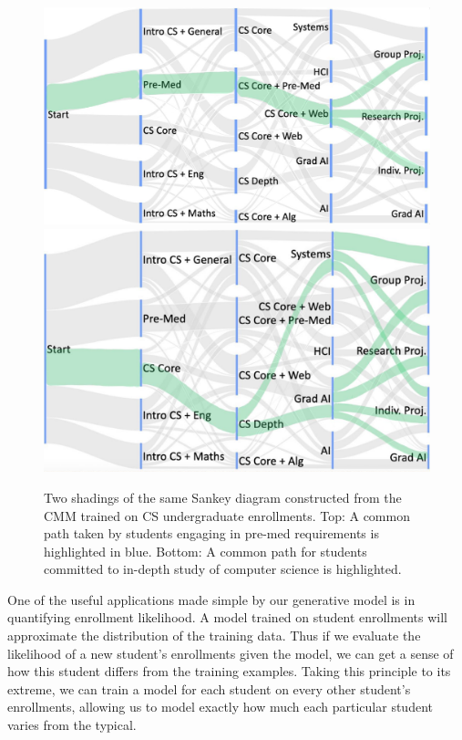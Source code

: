 \documentclass{edm_template}
\begin{document}
\begin{figure}[h!]
    \centering
    \includegraphics[width=0.45\linewidth]{figures/premed_highlight.jpg} 
    \qquad
    \includegraphics[width=0.41\linewidth]{figures/systems_highlight.jpg}
    \caption{\label{fig:cs_sankeys} Two shadings of the same Sankey diagram constructed from the CMM trained on CS undergraduate enrollments. Top: A common path taken by students engaging in pre-med requirements is highlighted in blue. Bottom: A common path for students committed to in-depth study of computer science is highlighted.}
\end{figure}

One of the useful applications made simple by our generative model is in quantifying enrollment likelihood. A model trained on student enrollments will approximate the distribution of the training data. Thus if we evaluate the likelihood of a new student's enrollments given the model, we can get a sense of how this student differs from the training examples. Taking this principle to its extreme, we can train a model for each student on every other student's enrollments, allowing us to model exactly how much each particular student varies from the typical. 
\end{document}
